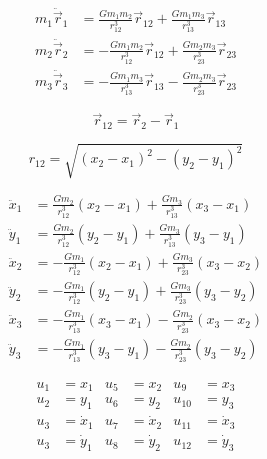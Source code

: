 \documentclass[a4paper,twoside,12pt,hidelinks]{article}
\begin{document}
\thispagestyle{empty}


\begin{align*}
  m_1 \ddot{\vec{r}}_1 & = \frac{G m_1 m_2}{r^3_{12}} \vec{r}_{12} + \frac{G m_1 m_3}{r^3_{13}} \vec{r}_{13} \\
  m_2 \ddot{\vec{r}}_2 & = - \frac{G m_1 m_2}{r^3_{12}} \vec{r}_{12} + \frac{G m_2 m_3}{r^3_{23}} \vec{r}_{23} \\
  m_3 \ddot{\vec{r}}_3 & = - \frac{G m_1 m_3}{r^3_{13}} \vec{r}_{13} - \frac{G m_2 m_3}{r^3_{23}} \vec{r}_{23}
\end{align*}

\[
  \vec{r}_{12} = \vec{r}_{2} - \vec{r}_{1}
\]

\[
  r_{12} = \sqrt{ (x_2 - x_1)^2 - (y_2 - y_1)^2 }
\]

\begin{align*}
  \ddot{x}_1 & = \frac{G m_2}{r^3_{12}} (x_2 - x_1)  + \frac{G m_3}{r^3_{13}} (x_3 - x_1) \\
  \ddot{y}_1 & = \frac{G m_2}{r^3_{12}} (y_2 - y_1)  + \frac{G m_3}{r^3_{13}} (y_3 - y_1) \\
  \ddot{x}_2 & = - \frac{G m_1}{r^3_{12}} (x_2 - x_1) + \frac{G m_3}{r^3_{23}} (x_3 - x_2) \\
  \ddot{y}_2 & = - \frac{G m_1}{r^3_{12}} (y_2 - y_1) + \frac{G m_3}{r^3_{23}} (y_3 - y_2) \\
  \ddot{x}_3 & = - \frac{G m_1 }{r^3_{13}} (x_3 - x_1) - \frac{G m_2}{r^3_{23}} (x_3 - x_2) \\
  \ddot{y}_3 & = - \frac{G m_1 }{r^3_{13}} (y_3 - y_1) - \frac{G m_2}{r^3_{23}} (y_3 - y_2)
\end{align*}


\begin{align*}
  & & & & u_1 & = x_1       &  u_5 & = x_2         &  u_9 & = x_3 & & & & \\
  & & & & u_2 & = y_1       &  u_6 & = y_2         &  u_{10} & = y_3 & & & & \\
  & & & & u_3 & = \dot{x}_1 &  u_7 & = \dot{x}_2   &  u_{11} & = \dot{x}_3 & & & & \\
  & & & & u_3 & = \dot{y}_1 &  u_8 & = \dot{y}_2   &  u_{12} & = \dot{y}_3 & & & &
\end{align*}
\end{document}
